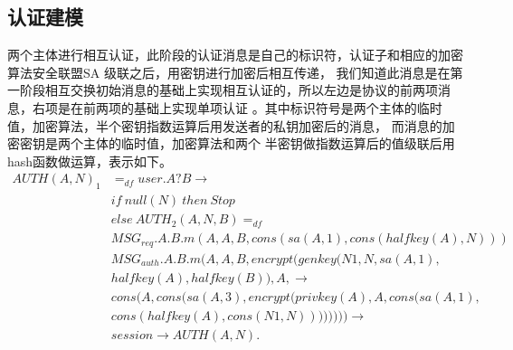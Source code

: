 \documentclass[UTF8]{ctexart}
\begin{document}
\subsection{认证建模}
\par{
	两个主体进行相互认证，此阶段的认证消息是自己的标识符，认证子和相应的加密算法安全联盟SA 级联之后，用密钥进行加密后相互传递，
	我们知道此消息是在第一阶段相互交换初始消息的基础上实现相互认证的，所以左边是协议的前两项消息，右项是在前两项的基础上实现单项认证
	。其中标识符号是两个主体的临时值，加密算法，半个密钥指数运算后用发送者的私钥加密后的消息，
	而消息的加密密钥是两个主体的临时值，加密算法和两个
	半密钥做指数运算后的值级联后用hash函数做运算，表示如下。
	\begin{equation}
		\begin{aligned}
			AUTH(A,N)_{1} &=_{df} user.A?B \rightarrow \\
			& if  \  null(N)  \  then  \  Stop \\
			& else \   AUTH_{2}(A,N,B)=_{df} \\
			&MSG_{req}.A.B.m(A,A,B,cons(sa(A,1),cons(halfkey(A),N))) \\
			&MSG_{auth}.A.B.m(A,A,B,encrypt(genkey(N1,N,sa(A,1),\\
			&halfkey(A),halfkey(B)),A, \rightarrow  \\
			&cons(A,cons(sa(A,3),encrypt(privkey(A),A,cons(sa(A,1),\\
			&cons(halfkey(A),cons(N1,N)))))))) \rightarrow \\
			&session \rightarrow AUTH(A,N).
	\end{aligned}
	\end{equation}

}
\end{document}
